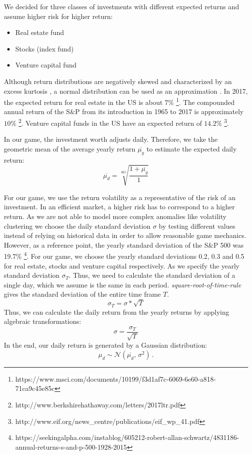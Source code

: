   We decided for three classes of investments with different expected returns and assume higher risk for higher return:
\begin{itemize}
	\item Real estate fund
	\item Stocks (index fund)
	\item Venture capital fund
\end{itemize}

Although return distributions are negatively skewed and characterized by an excess kurtosis \cite{ANDERSEN200143}, a normal distribution can be used as an approximation \cite{doi:10.1080/01621459.1972.10481297}. In 2017, the expected return for real estate in the US is about $7\%$ \footnote{https://www.msci.com/documents/10199/f3d1af7c-6069-6e60-a818-71ca9c45e85c}. The compounded annual return of the S\&P from its introduction in 1965 to 2017 is approximately $10\%$ \footnote{http://www.berkshirehathaway.com/letters/2017ltr.pdf}. Venture capital funds in the US have an expected return of $14.2\%$ \footnote{http://www.eif.org/news\_centre/publications/eif\_wp\_41.pdf}.

In our game, the investment worth adjusts daily. Therefore, we take the geometric mean of the average yearly return $\overline{\mu_y}$ to estimate the expected daily return:
\begin{equation}
	\overline{\mu_d} = \sqrt[365]{\frac{1 + \overline{\mu_y}}{1}}
\end{equation}

For our game, we use the return volatility as a representative of the risk of an investment. In an efficient market, a higher risk has to correspond to a higher return. As we are not able to model more complex anomalies like volatility clustering \cite{lux2000volatility} we choose the daily standard deviation $\sigma$ by testing different values instead of relying on historical data in order to allow reasonable game mechanics. However, as a reference point, the yearly standard deviation of the S\&P 500 was 19.7\% \footnote{https://seekingalpha.com/instablog/605212-robert-allan-schwartz/4831186-annual-returns-s-and-p-500-1928-2015}. For our game, we choose the yearly standard deviations 0.2, 0.3 and 0.5 for real estate, stocks and venture capital respectively.
As we specify the yearly standard deviation $\sigma_T$. Thus, we need to calculate the standard deviation of a single day, which we assume is the same in each period. \textit{square-root-of-time-rule} gives the standard deviation of the entire time frame $T$.
\begin{equation}
    \sigma_T = \sigma*\sqrt{T}
\end{equation}
Thus, we can calculate the daily return from the yearly returns by applying algebraic transformations:
\begin{equation}
    \sigma = \frac{\sigma_T}{\sqrt{T}}
\end{equation}
In the end, our daily return is generated by a Gaussian distribution:
\begin{equation}
	\mu_d \sim \mathcal{N}(\overline{\mu_d},\,\sigma^{2})\,.
\end{equation}



